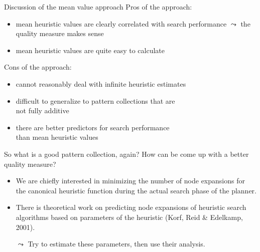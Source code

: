\documentclass{gkibeamer}
\begin{document}
\begin{frame}{Discussion of the mean value approach}
  Pros of the approach:
  \begin{itemize}
  \item mean heuristic values are clearly correlated with search
    performance $\leadsto$ the \alert{quality measure makes sense}
  \item mean heuristic values are quite \alert{easy to calculate}
  \end{itemize}

  \medskip

  Cons of the approach:
  \begin{itemize}
  \item cannot reasonably deal with \alert{infinite} heuristic
    estimates
  \item difficult to generalize to pattern collections that are \\
    \alert{not fully additive}
  \item there are \alert{better predictors} for search performance \\
    than mean heuristic values
  \end{itemize}
\end{frame}

\begin{frame}{So what is a good pattern collection, again?}
  How can be come up with a better quality measure?
  \begin{itemize}
  \item We are chiefly interested in \alert{minimizing the number of
    node expansions} for the \alert{canonical heuristic function}
    during the \alert{actual search phase} of the planner.
  \item There is theoretical work on \alert{predicting node
    expansions} of heuristic search algorithms based on
    parameters of the heuristic (Korf, Reid \& Edelkamp, 2001).
  \item[$\leadsto$] Try to estimate these parameters, then use their
    analysis.
  \end{itemize}
\end{frame}
\end{document}
